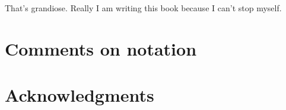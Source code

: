 That's grandiose.
Really I am writing this book because I can't stop myself.

\section{Comments on notation}

\section{Acknowledgments}
